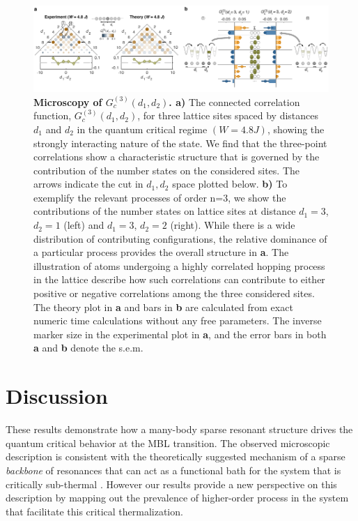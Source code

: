 \begin{figure}[t!]
		\includegraphics[width=\columnwidth]{figures/ch6/fig4.pdf} 
		\caption{\textbf{Microscopy of $G^{(3)}_c(d_1,d_2)$. a)}  The connected correlation function, $G^{(3)}_c(d_1,d_2)$, for three lattice sites spaced by distances $d_1$ and $d_2$ in the quantum critical regime $(W=4.8J)$, showing the strongly interacting nature of the state. We find that the three-point correlations show a characteristic structure that is governed by the contribution of the number states on the considered sites. The arrows indicate the cut in $d_1,d_2$ space plotted below. \textbf{b)} To exemplify the relevant processes of order n=3, we show the contributions of the number states on lattice sites at distance $d_1=3$, $d_2=1$ (left) and $d_1=3$, $d_2=2$ (right). While there is a wide distribution of contributing configurations, the relative dominance of a particular process provides the overall structure in \textbf{a}. The illustration of atoms undergoing a highly correlated hopping process in the lattice describe how such correlations can contribute to either positive or negative correlations among the three considered sites. The theory plot in \textbf{a} and bars in \textbf{b} are calculated from exact numeric time calculations without any free parameters. The inverse marker size in the experimental plot in \textbf{a}, and the error bars in both \textbf{a} and \textbf{b} denote the s.e.m. }
		\label{fig:g3microscopy}	
\end{figure}

\section{Discussion}

These results\cite{Rispoli2018} demonstrate how a many-body sparse resonant structure drives the quantum critical behavior at the MBL transition. The observed microscopic description is consistent with the theoretically suggested mechanism of a sparse \emph{backbone} of resonances that can act as a functional bath for the system that is critically sub-thermal \cite{Khemani2017, Grover2014, Potter2015}. However our results provide a new perspective on this description by mapping out the prevalence of higher-order process in the system that facilitate this critical thermalization.

